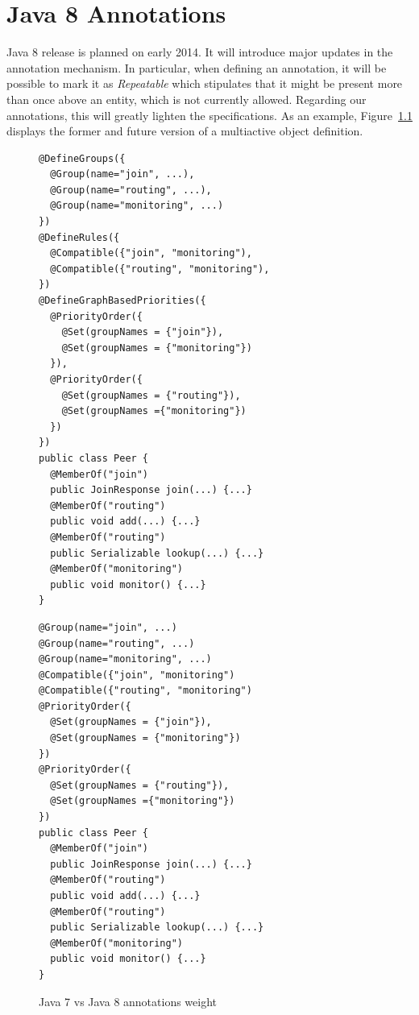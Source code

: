 \documentclass[11pt]{report}
\begin{document}



\appendix
\chapter{Java 8 Annotations}

Java 8 release is planned on early 2014. It will introduce major updates in the annotation mechanism. In particular, when defining an annotation, it will be possible to mark it as \emph{Repeatable} which stipulates that it might be present more than once above an entity, which is not currently allowed. Regarding our annotations, this will greatly lighten the specifications. As an example, Figure~\ref{fig:java8} displays the former and future version of a multiactive object definition.

\begin{figure}[!ht]
	\lstset{language=java, numberstyle=\tiny, stepnumber=1, numbersep=5pt, basicstyle=\footnotesize}
	\begin{minipage}[b]{0.48\textwidth}
	\begin{lstlisting}[frame=single]
@DefineGroups({
  @Group(name="join", ...),
  @Group(name="routing", ...),
  @Group(name="monitoring", ...)
})
@DefineRules({
  @Compatible({"join", "monitoring"),
  @Compatible({"routing", "monitoring"),
})
@DefineGraphBasedPriorities({
  @PriorityOrder({
    @Set(groupNames = {"join"}),
    @Set(groupNames = {"monitoring"})
  }),
  @PriorityOrder({
    @Set(groupNames = {"routing"}),
    @Set(groupNames ={"monitoring"})
  })
})
public class Peer {
  @MemberOf("join")
  public JoinResponse join(...) {...}
  @MemberOf("routing")
  public void add(...) {...}
  @MemberOf("routing")
  public Serializable lookup(...) {...}
  @MemberOf("monitoring")
  public void monitor() {...}
}
 	\end{lstlisting}
 	\end{minipage}
 	\nointerlineskip
	\begin{minipage}[b]{0.49\textwidth}
	\begin{lstlisting}[frame=single]
@Group(name="join", ...)
@Group(name="routing", ...)
@Group(name="monitoring", ...)
@Compatible({"join", "monitoring")
@Compatible({"routing", "monitoring")
@PriorityOrder({
  @Set(groupNames = {"join"}),
  @Set(groupNames = {"monitoring"})
})
@PriorityOrder({
  @Set(groupNames = {"routing"}),
  @Set(groupNames ={"monitoring"})
})
public class Peer {
  @MemberOf("join")
  public JoinResponse join(...) {...}
  @MemberOf("routing")
  public void add(...) {...}
  @MemberOf("routing")
  public Serializable lookup(...) {...}
  @MemberOf("monitoring")
  public void monitor() {...}
}
	\end{lstlisting}
 	\end{minipage}	
	\caption{Java 7 vs Java 8 annotations weight}
	\label{fig:java8}
\end{figure}
\end{document}
